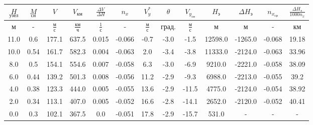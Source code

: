 \begin{tabular}{|c|c|c|c|c|c|c|c|c|c|c|c|c|}
\hline
$\underset{узел}{H}$ & $\underset{сн}{M}$ & $V$ & $V_{км}$ & $\frac{\Delta V}{\Delta H}$ & $n_x$ & $V_{y}^*$ & $\theta$ & $V_{y_{сн}}$ & $H_э$ & $\Delta H_э$ & $n_{x_{ср}}$ & $\frac{\Delta H_{э}}{1000 n_x}$ \\ 
\hline
м & - & $\frac{м}{с}$ & $\frac{км}{ч}$ & $\frac{1}{с}$ & - & $\frac{м}{с}$ & $град.$ & $\frac{м}{с}$ & м & м & - & км \\ 
\hline
11.0 & 0.6 & 177.1 & 637.5 & 0.015 & -0.066 & -0.7 & -3.0 & -1.5 & 12598.0 & -1265.0 & -0.068 & 19.18 \\ 
\hline
10.0 & 0.54 & 161.7 & 582.3 & 0.004 & -0.063 & 2.0 & -3.4 & -3.8 & 11333.0 & -2124.0 & -0.063 & 33.96 \\ 
\hline
8.0 & 0.5 & 154.1 & 554.6 & 0.007 & -0.058 & 6.3 & -3.0 & -6.9 & 9210.0 & -2221.0 & -0.058 & 38.09 \\ 
\hline
6.0 & 0.44 & 139.2 & 501.3 & 0.008 & -0.056 & 11.2 & -2.9 & -9.3 & 6988.0 & -2213.0 & -0.055 & 39.2 \\ 
\hline
4.0 & 0.38 & 123.3 & 444.0 & 0.005 & -0.055 & 13.6 & -2.9 & -11.5 & 4775.0 & -2124.0 & -0.054 & 38.92 \\ 
\hline
2.0 & 0.34 & 113.1 & 407.0 & 0.005 & -0.052 & 16.6 & -2.8 & -14.1 & 2652.0 & -2120.0 & -0.052 & 40.41 \\ 
\hline
0.0 & 0.3 & 102.1 & 367.5 & 0.0 & -0.051 & 17.8 & -2.9 & -15.7 & 531.0 & - & - & - \\ 
\hline
\end{tabular}